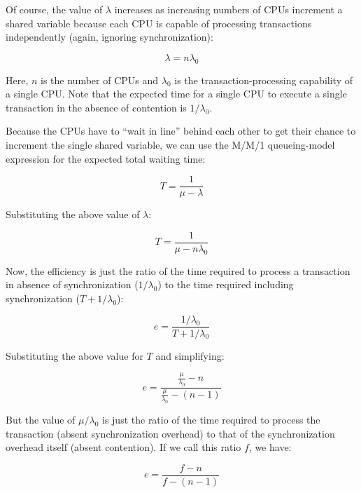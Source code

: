Of course, the value of $\lambda$ increases as increasing numbers of CPUs
increment a shared variable because each CPU is capable of processing
transactions independently (again, ignoring synchronization):

\begin{equation}
	\lambda = n \lambda_0
\end{equation}

Here, $n$ is the number of CPUs and $\lambda_0$ is the transaction-processing
capability of a single CPU\@.
Note that the expected time for a single CPU to execute a single transaction
in the absence of contention is $1 / \lambda_0$.

Because the CPUs have to ``wait in line'' behind each other to get their
chance to increment the single shared variable, we can use the M/M/1
queueing-model expression for the expected total waiting time:

\begin{equation}
	T = \frac{1}{\mu - \lambda}
\end{equation}

Substituting the above value of $\lambda$:

\begin{equation}
	T = \frac{1}{\mu - n \lambda_0}
\end{equation}

Now, the efficiency is just the ratio of the time required to process
a transaction in absence of synchronization ($1 / \lambda_0$)
to the time required including synchronization ($T + 1 / \lambda_0$):

\begin{equation}
	e = \frac{1 / \lambda_0}{T + 1 / \lambda_0}
\end{equation}

Substituting the above value for $T$ and simplifying:

\begin{equation}
	e = \frac{\frac{\mu}{\lambda_0} - n}{\frac{\mu}{\lambda_0} - (n - 1)}
\end{equation}

But the value of $\mu / \lambda_0$ is just the ratio of the time required
to process the transaction (absent synchronization overhead) to that of
the synchronization overhead itself (absent contention).
If we call this ratio $f$, we have:

\begin{equation}
	e = \frac{f - n}{f - (n - 1)}
\end{equation}

